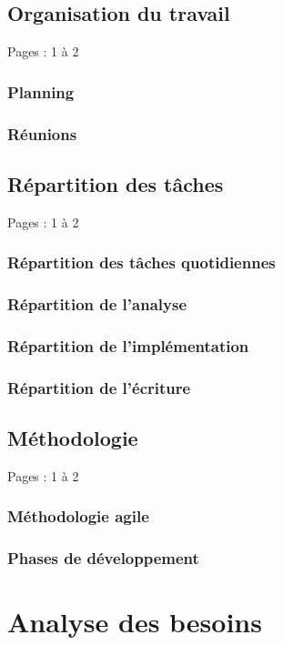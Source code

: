 \documentclass{eplmastersthesis_FR}
\begin{document}
		\section{Organisation du travail}

			Pages : 1 à 2

			\subsection*{Planning}
			\subsection*{Réunions}

		\section{Répartition des tâches}

			Pages : 1 à 2

			\subsection*{Répartition des tâches quotidiennes}
			\subsection*{Répartition de l'analyse}
			\subsection*{Répartition de l'implémentation}
			\subsection*{Répartition de l'écriture}

		\section{Méthodologie}

			Pages : 1 à 2

			\subsection*{Méthodologie agile}
			\subsection*{Phases de développement}

	\chapter{Analyse des besoins}
\end{document}
